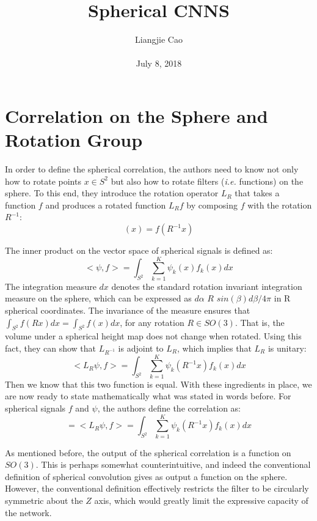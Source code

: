\documentclass[10pt,twocolumn,letterpaper]{article}
\begin{document}
\title{\textbf{Spherical CNNS
}}
\author{Liangjie Cao\\\\ July 8, 2018}
\maketitle
\section{Correlation on the Sphere and Rotation Group}
 \par In order to define the spherical correlation, the authors need to know not only how to rotate points $x\in{S^2}$ but also how to rotate filters (\emph{i.e.} functions) on the sphere. To this end, they introduce the rotation operator $L_R$ that takes a function $f$ and produces a rotated function $L_R{f}$ by composing $f$ with the rotation $R^{-1}$:
\begin{equation}
[L_R{f}](x)=f(R^{-1}x)
\end{equation}\label{1}
 \par The inner product on the vector space of spherical signals is defined as:
\begin{equation}
<\psi,f>=\int_{S^2}\sum_{k=1}^{K}\psi_{k}(x)f_k(x)dx
\end{equation}\label{2}
The integration measure $dx$ denotes the standard rotation invariant integration measure on the sphere, which can be expressed as $d\alpha$ $R$ $sin(\beta)d\beta/4\pi$ in R spherical coordinates. The invariance of the measure ensures that $\int_{S^2}f(Rx)dx=\int_{S^2}f(x)dx$, for any rotation $R\in{SO(3)}$. That is, the volume under a spherical height map does not change when rotated. Using this fact, they can show that $L_{R^{-1}}$ is adjoint to $L_R$, which implies that $L_R$ is unitary:
\begin{equation}
<L_R{\psi},f>=\int_{S^2}\sum_{k=1}^{K}\psi_k(R^{-1}x)f_{k}(x)dx
\end{equation}\label{3}
Then we know that this two function is equal. With these ingredients in place, we are now ready to state mathematically what was stated in words before. For spherical signals $f$ and $\psi$, the authors define the correlation as:
\begin{equation}
[\psi\star{f}]=<L_{R}\psi,f>=\int_{S^2}\sum_{k=1}^{K}\psi_k(R^{-1}x)f_{k}(x)dx
\end{equation}\label{4}
\par As mentioned before, the output of the spherical correlation is a function on $SO(3)$. This is perhaps somewhat counterintuitive, and indeed the conventional definition of spherical convolution gives as output a function on the sphere. However, the conventional definition effectively restricts the filter to be circularly symmetric about the $Z$ axis, which would greatly limit the expressive capacity of the network.
\end{document}
